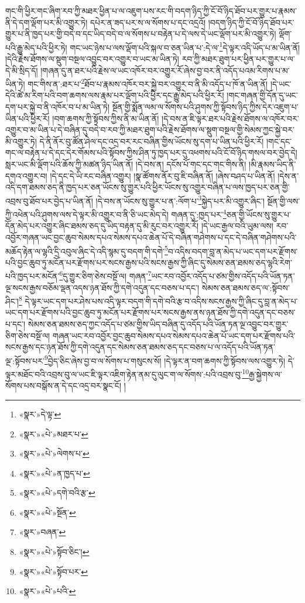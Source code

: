 གང་གི་ཕྱིར་གང་ཞིག་རབ་ཀྱི་མཐར་ཕྱིན་པ་ལ་འཇུག་པས་རང་གི་བདག་ཉིད་ཀྱི་ངོ་བོ་ཉིད་ཐོབ་པར་གྱུར་པ་རྣམས་ནི་དེ་དག་ལྡོག་པར་མི་འགྱུར་ཏེ། དཔེར་ན་ཟད་པར་ས་ལ་སོགས་པ་དང་འདྲའོ། །བདག་ཉིད་ཀྱི་ངོ་བོ་ཉིད་ཐོབ་པར་གྱུར་པ་ནི་ཁྱད་པར་གྱི་བདེ་བ་དང་ཡིད་བདེ་བ་ལ་སོགས་པ་བརྟེན་པ་དེ་ལས་དེ་ཡང་ལྡོག་པར་མི་འགྱུར་ཏེ། ལྡོག་པའི་རྒྱུ་མེད་པའི་ཕྱིར་ཏེ། གང་ཡང་ཉེས་པ་ལས་ལྡོག་པའི་སྐལ་བ་ཅན་ཡིན་པ་:དེ་ལ་\footnote{«སྣར་»དེ་ལྟ་}དེ་ལྟར་འདི་ཡོད་པ་མ་ཡིན་ནོ། །དེའི་རྗེས་ཐོགས་ལ་སྡུག་བསྔལ་འབྱུང་བར་འགྱུར་བ་ཡང་མ་ཡིན་ཏེ། རབ་ཀྱི་མཐར་ཐུག་པར་ཕྱིན་པར་གྱུར་པ་ལ་དེ་མི་སྲིད་དོ། །གཞན་དུ་ན་ཐར་པའི་རྗེས་ལ་ཡང་འཁོར་བར་འགྱུར་རོ་ཞེས་བྱ་བར་ནི་འདོད་པའམ་རིགས་པ་མ་ཡིན་ཏེ། གང་གིས་ན་:ཐར་པ་\footnote{«སྣར་»«པེ་»མཐར་པ་}ཐོབ་པ་རྣམས་འཁོར་བར་སྐྱེ་བར་འགྱུར་བ་ནི་མི་འདོད་པ་ཁོ་ན་ཡིན་ནོ། །དེ་ཡང་དེའི་ཚེ་མ་རིག་པའི་བག་ཆགས་ལས་རྣམ་པར་ལྡོག་པའི་ཕྱིར་དང་རྒྱུ་མེད་པའི་ཕྱིར་རོ། །གང་གཞན་གྱི་དོན་དུ་ཡང་དག་པར་སྐྱེ་བ་ནི་འཁོར་བ་པ་མ་ཡིན་ཏེ། སྔོན་གྱི་སྨོན་ལམ་ལ་སོགས་པའི་ཤུགས་ཀྱི་སྟོབས་ཉིད་ཀྱིས་དེར་འཇུག་པ་ཡིན་པའི་ཕྱིར་རོ། །བག་ཆགས་ཀྱི་སྟོབས་ཀྱིས་ནི་མ་ཡིན་ནོ། །དེ་བས་ན་ཇི་ལྟར་ཐར་པའི་རྗེས་ཐོགས་ལ་འཁོར་བར་འགྱུར་བ་མ་ཡིན་པ་དེ་བཞིན་དུ་བདེ་བ་རབ་ཀྱི་མཐར་ཐུག་པའི་རྗེས་ཐོགས་ལ་སྡུག་བསྔལ་གྱི་སེམས་ཀྱང་སྐྱེ་བར་མི་འགྱུར་ཏེ། དེ་ནི་ནོར་བུ་ཚོན་ཤེལ་དང་འདྲ་བར་རང་བཞིན་གྱིས་ཡོངས་སུ་དག་པ་ཡིན་པའི་ཕྱིར་རོ། །གང་དང་གང་ལ་བརྟེན་པ་དེ་དང་དེར་གོམས་པའི་སྟོབས་ཀྱིས་ཤིན་ཏུ་ཁྱད་པར་དུ་འཕགས་པའི་ངོ་བོ་ཉིད་གསལ་བར་བྱེད་དེ། སླར་ཡང་མི་ལྡོག་པའི་ཆོས་ཀྱི་མཚན་ཉིད་ཡིན་ནོ། །དེ་བས་ན། དངོས་པོ་གང་དང་གང་གིས་ནི། །མི་རྣམས་ཡིད་ནི་དགའ་འགྱུར་བ། །དེ་དང་དེ་ཡི་རང་བཞིན་འགྱུར། །སྣ་ཚོགས་ནོར་བུ་ཇི་བཞིན་ནོ། །ཞེས་བཤད་པ་ཡིན་ནོ། །དེས་ན་འདི་དག་ཐམས་ཅད་ནི་ཁྱད་པར་ཅན་ཡོངས་སུ་གྱུར་པའི་ཕྱིར་ཡོངས་སུ་འགྱུར་བཞིན་པ་ལས་ཁྱད་པར་ཅན་གྱི་འབྲས་བུ་ཐོབ་པར་བྱེད་པ་ཡིན་ནོ། །དེ་བས་ན་ཡོངས་སུ་གྱུར་པ་ན་:ལོག་པ་\footnote{«སྣར་»«པེ་»ལེགས་པ་}སྐྱེད་པར་མི་འགྱུར་ཞིང་། སྔོན་གྱི་ལས་ཀྱི་འཕེན་པའི་ཤུགས་ལས་དེ་ལྟར་མི་འགྱུར་བ་ནི་ཅི་ཡང་མེད་དེ། གཞན་དུ་:ཁྱད་པར་\footnote{«སྣར་»«པེ་»ན་ཁྱད་པ་}ཅན་གྱི་ཡོངས་སུ་གྱུར་པ་དོན་མེད་པར་འགྱུར་ཞིང་ཐམས་ཅད་དུ་ཡིད་བརྟན་དུ་མི་རུང་བར་འགྱུར་རོ། །དེ་ཡང་རྒྱལ་བའི་ཡུམ་ལས། རབ་འབྱོར་གཞན་ཡང་བྱང་ཆུབ་སེམས་དཔའ་སེམས་དཔའ་ཆེན་པོ་དེ་བཞིན་གཤེགས་པ་དང་དེ་བཞིན་གཤེགས་པའི་མཆོད་རྟེན་ལ་ལྷའི་དྲི་འབུལ་ཞིང་དེ་འདི་སྙམ་དུ་བདག་གི་དགེ་\footnote{«སྣར་»«པེ་»དགེ་བའི་རྩ་}བ་འདིས་བདག་བླ་ན་མེད་པ་ཡང་དག་པར་རྫོགས་པའི་བྱང་ཆུབ་ཏུ་མངོན་པར་རྫོགས་པར་སངས་རྒྱས་པའི་སངས་རྒྱས་ཀྱི་ཞིང་དུ་སེམས་ཅན་ཐམས་ཅད་ལྷའི་རེག་པའི་ཁྱད་པར་མངོན་\footnote{«སྣར་»«པེ་»སྔོན་}དུ་གྱུར་ཅིག་ཅེས་བསྔོ་ལ། གཞན་\footnote{«སྣར་»བཞན་}ཡང་རབ་འབྱོར་འདོད་པ་ཙམ་གྱིས་འདོད་པའི་ཡོན་ཏན་ལྔ་སངས་རྒྱས་བཅོམ་ལྡན་འདས་ཉན་ཐོས་ཀྱི་དགེ་འདུན་དང་བཅས་པ་དང་། སེམས་ཅན་ཐམས་ཅད་ལ་:སྟོབས་ཤིང་།\footnote{«སྣར་»«པེ་»སྟོབ་ཅིང་།} དེ་ལྟར་ཡང་དག་པར་ཤེས་པས་འདི་ལྟར་བདག་གི་དགེ་བའི་རྩ་བ་འདིས་སངས་རྒྱས་ཀྱི་ཞིང་དུ་བླ་ན་མེད་པ་ཡང་དག་པར་རྫོགས་པའི་བྱང་ཆུབ་ཏུ་མངོན་པར་རྫོགས་པར་སངས་རྒྱས་ནས་ཉན་ཐོས་ཀྱི་དགེ་འདུན་དང་བཅས་པ་དང་། སེམས་ཅན་ཐམས་ཅད་ཀྱང་འདོད་པ་ཙམ་གྱིས་ཡིད་བཞིན་དུ་འདོད་པའི་ཡོན་ཏན་ལྔ་འབྱུང་བར་གྱུར་ཅིག་ཅེས་བསྔོ་ལ། གཞན་ཡང་རབ་འབྱོར་བྱང་ཆུབ་སེམས་དཔའ་སེམས་དཔའ་ཆེན་པོ་ཡང་དག་པར་རྫོགས་པའི་སངས་རྒྱས་དང་ཉན་ཐོས་ཀྱི་དགེ་འདུན་དང་སེམས་ཅན་ཐམས་ཅད་དང་བཅས་པ་ལ་འདོད་པའི་ཡོན་ཏན་ལྔ་:སྟོབས་པར་\footnote{«སྣར་»«པེ་»སྟོབ་པར་}བྱེད་ཅིང་ཞེས་བྱ་བ་ལ་སོགས་པ་གསུངས་སོ། །དེ་ལྟར་ན་བག་ཆགས་ཀྱི་སྟོབས་ལས་འགྱུར་ཏེ། དེ་ལྟར་མཐོང་བའི་འབྲས་བུ་ལ་ཡང་ཇི་ལྟར་འཇིག་རྟེན་ནམ་དུ་ལུང་ག་ལ་སོགས་:པའི་འབྲས་བུ་\footnote{«སྣར་»«པེ་»པའི་}རྒྱ་སྐྱེགས་ལ་སོགས་པས་བསྒོས་ན་དེ་དང་འདྲ་བར་སྣང་ངོ། །
